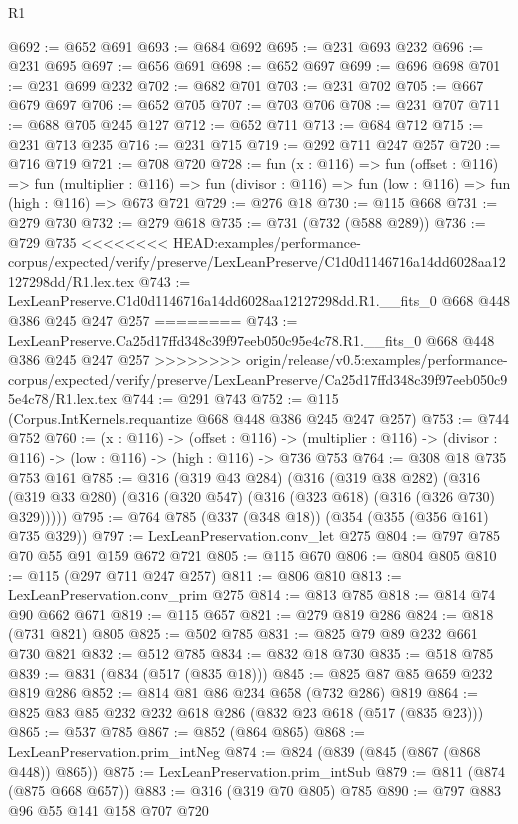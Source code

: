 \begin{lexlean}{R1}
\begin{coremodule}
{{{{{{{@692 := @652 @691
@693 := @684 @692
@695 := @231 @693 @232
@696 := @231 @695
@697 := @656 @691
@698 := @652 @697
@699 := @696 @698
@701 := @231 @699 @232
@702 := @682 @701
@703 := @231 @702
@705 := @667 @679 @697
@706 := @652 @705
@707 := @703 @706
@708 := @231 @707
@711 := @688 @705 @245 @127
@712 := @652 @711
@713 := @684 @712
@715 := @231 @713 @235
@716 := @231 @715
@719 := @292 @711 @247 @257
@720 := @716 @719
@721 := @708 @720
@728 := fun (x : @116) =>
  fun (offset : @116) =>
  fun (multiplier : @116) =>
  fun (divisor : @116) => fun (low : @116) => fun (high : @116) => @673 @721
@729 := @276 @18
@730 := @115 @668
@731 := @279 @730
@732 := @279 @618
@735 := @731 (@732 (@588 @289))
@736 := @729 @735
<<<<<<<< HEAD:examples/performance-corpus/expected/verify/preserve/LexLeanPreserve/C1d0d1146716a14dd6028aa12127298dd/R1.lex.tex
@743 := LexLeanPreserve.C1d0d1146716a14dd6028aa12127298dd.R1.__fits_0 @668 @448 @386 @245 @247 @257
========
@743 := LexLeanPreserve.Ca25d17ffd348c39f97eeb050c95e4c78.R1.__fits_0 @668 @448 @386 @245 @247 @257
>>>>>>>> origin/release/v0.5:examples/performance-corpus/expected/verify/preserve/LexLeanPreserve/Ca25d17ffd348c39f97eeb050c95e4c78/R1.lex.tex
@744 := @291 @743
@752 := @115 (Corpus.IntKernels.requantize @668 @448 @386 @245 @247 @257)
@753 := @744 @752
@760 := (x : @116) ->
  (offset : @116) ->
  (multiplier : @116) -> (divisor : @116) -> (low : @116) -> (high : @116) -> @736 @753
@764 := @308 @18 @735 @753 @161
@785 := @316
    (@319 @43 @284)
    (@316
      (@319 @38 @282)
      (@316 (@319 @33 @280) (@316 (@320 @547) (@316 (@323 @618) (@316 (@326 @730) @329)))))
@795 := @764 @785 (@337 (@348 @18)) (@354 (@355 (@356 @161) @735 @329))
@797 := LexLeanPreservation.conv_let @275
@804 := @797 @785 @70 @55 @91 @159 @672 @721
@805 := @115 @670
@806 := @804 @805
@810 := @115 (@297 @711 @247 @257)
@811 := @806 @810
@813 := LexLeanPreservation.conv_prim @275
@814 := @813 @785
@818 := @814 @74 @90 @662 @671
@819 := @115 @657
@821 := @279 @819 @286
@824 := @818 (@731 @821) @805
@825 := @502 @785
@831 := @825 @79 @89 @232 @661 @730 @821
@832 := @512 @785
@834 := @832 @18 @730
@835 := @518 @785
@839 := @831 (@834 (@517 (@835 @18)))
@845 := @825 @87 @85 @659 @232 @819 @286
@852 := @814 @81 @86 @234 @658 (@732 @286) @819
@864 := @825 @83 @85 @232 @232 @618 @286 (@832 @23 @618 (@517 (@835 @23)))
@865 := @537 @785
@867 := @852 (@864 @865)
@868 := LexLeanPreservation.prim_intNeg
@874 := @824 (@839 (@845 (@867 (@868 @448)) @865))
@875 := LexLeanPreservation.prim_intSub
@879 := @811 (@874 (@875 @668 @657))
@883 := @316 (@319 @70 @805) @785
@890 := @797 @883 @96 @55 @141 @158 @707 @720
}}}}}}}
\end{coremodule}
\end{lexlean}
